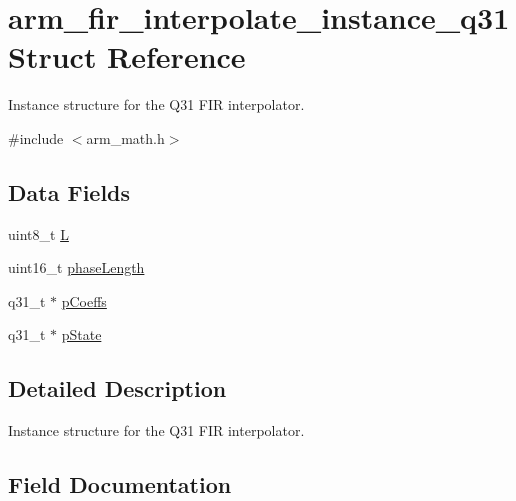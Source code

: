 \hypertarget{structarm__fir__interpolate__instance__q31}{}\section{arm\+\_\+fir\+\_\+interpolate\+\_\+instance\+\_\+q31 Struct Reference}
\label{structarm__fir__interpolate__instance__q31}


Instance structure for the Q31 F\+IR interpolator.  




{\ttfamily \#include $<$arm\+\_\+math.\+h$>$}

\subsection*{Data Fields}
\begin{DoxyCompactItemize}
\item 
uint8\+\_\+t \hyperlink{structarm__fir__interpolate__instance__q31_aee73cc056696e504430c53eaa9c58cf0}{L}
\item 
uint16\+\_\+t \hyperlink{structarm__fir__interpolate__instance__q31_a8f92bb07e0812f94679438cdf412b26a}{phase\+Length}
\item 
q31\+\_\+t $\ast$ \hyperlink{structarm__fir__interpolate__instance__q31_a68888e36167d81cb7836db10367a1682}{p\+Coeffs}
\item 
q31\+\_\+t $\ast$ \hyperlink{structarm__fir__interpolate__instance__q31_adee4ba3ee8869865af7d8fa08ca913d6}{p\+State}
\end{DoxyCompactItemize}


\subsection{Detailed Description}
Instance structure for the Q31 F\+IR interpolator. 

\subsection{Field Documentation}
\mbox{\label{structarm__fir__interpolate__instance__q31_aee73cc056696e504430c53eaa9c58cf0}} 

